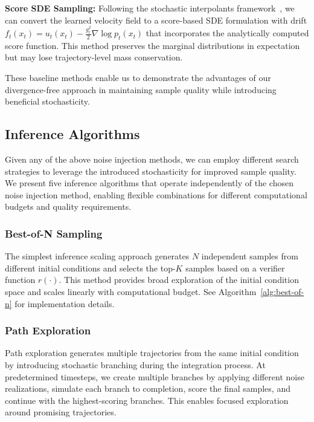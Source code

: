 \documentclass{article}
\begin{document}
\textbf{Score SDE Sampling:} Following the stochastic interpolants framework~\cite{ma2024sit}, we can convert the learned velocity field to a score-based SDE formulation with drift $f_t(x_t) = u_t(x_t) - \frac{g_t^2}{2} \nabla \log p_t(x_t)$ that incorporates the analytically computed score function. This method preserves the marginal distributions in expectation but may lose trajectory-level mass conservation.

These baseline methods enable us to demonstrate the advantages of our divergence-free approach in maintaining sample quality while introducing beneficial stochasticity.

\subsection{Inference Algorithms}

Given any of the above noise injection methods, we can employ different search strategies to leverage the introduced stochasticity for improved sample quality. We present five inference algorithms that operate independently of the chosen noise injection method, enabling flexible combinations for different computational budgets and quality requirements.

\subsubsection{Best-of-N Sampling}

The simplest inference scaling approach generates $N$ independent samples from different initial conditions and selects the top-$K$ samples based on a verifier function $r(\cdot)$. This method provides broad exploration of the initial condition space and scales linearly with computational budget. See Algorithm~\ref{alg:best-of-n} for implementation details.

\subsubsection{Path Exploration}

Path exploration generates multiple trajectories from the same initial condition by introducing stochastic branching during the integration process. At predetermined timesteps, we create multiple branches by applying different noise realizations, simulate each branch to completion, score the final samples, and continue with the highest-scoring branches. This enables focused exploration around promising trajectories.
\end{document}
